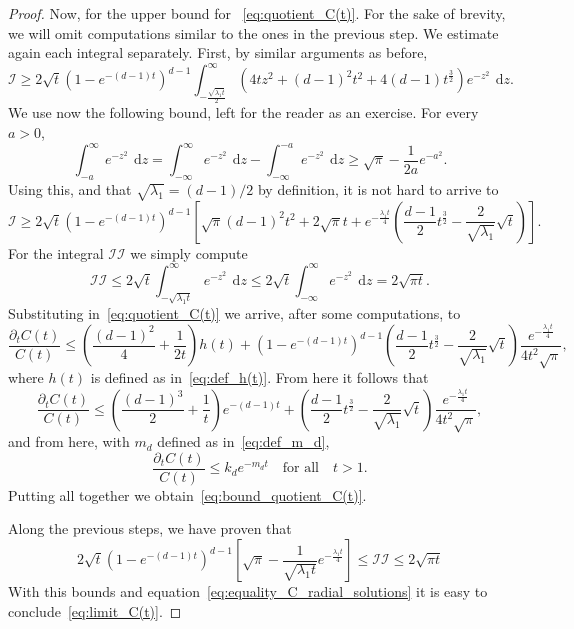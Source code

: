 \documentclass[12pt,longbibliography]{article}
\def\d{\,\mathrm{d}}
\def\d{\,\mathrm{d}}
\theoremstyle{definition}
\theoremstyle{remark}
\theoremstyle{example}
\begin{document}
\begin{proof}
	Now, for the upper bound  for ~\eqref{eq:quotient_C(t)}. For the sake of brevity, we will omit computations similar to the ones in the previous step. We estimate again each integral separately. First, by similar arguments as before,
	\[
	\mathcal{I}\geq 2\sqrt{t}\left(1-e^{-(d-1)t}\right)^{d-1}\int_{-\frac{\sqrt{\lambda_1 t}}{2}}^\infty \left(4tz^2 +(d-1)^2t^2  +4(d-1)t^\frac{3}{2}  \right) e^{-z^2}\ \d z.
	\]
	We use now the following bound, left for the reader as an exercise. For every $a>0$,
	\[
	\int_{-a}^\infty e^{-z^2}\ \d z = \int_{-\infty}^\infty e^{-z^2}\ \d z - \int_{-\infty}^{-a} e^{-z^2}\ \d z\geq \sqrt{\pi} - \frac{1}{2a}e^{-a^2}.
	\]
	Using this, and that $\sqrt{\lambda_1}=(d-1)/2$ by definition, it is not hard to arrive to
	\[
	\mathcal{I}\geq 2\sqrt{t}\left(1-e^{-(d-1)t}  \right)^{d-1}\left[\sqrt{\pi}(d-1)^2t^2+2\sqrt{\pi}t + e^{-\frac{\lambda_1 t}{4}}\left(   \frac{d-1}{2}t^\frac{3}{2} - \frac{2}{\sqrt{\lambda_1}}\sqrt{t}  \right)  \right].
	\]
	For the integral $\mathcal{II}$ we simply compute
	\[
	\mathcal{II}\leq 2\sqrt{t}\int_{-\sqrt{\lambda_1 t}}^\infty e^{-z^2}\ \d z\leq 2\sqrt{t}\int_{-\infty}^\infty e^{-z^2}\ \d z = 2\sqrt{\pi t}.
	\]
	Substituting in~\eqref{eq:quotient_C(t)} we arrive, after some computations, to
	\[
	\frac{\partial_t C(t)}{C(t)}\leq \left( \frac{(d-1)^2}{4} + \frac{1}{2t} \right)h(t) + \left(1-e^{-(d-1)t}  \right)^{d-1} \left( \frac{d-1}{2}t^\frac{3}{2} - \frac{2}{\sqrt{\lambda_1}}\sqrt{t} \right) \frac{e^{-\frac{\lambda_1 t}{4}}}{4t^2\sqrt{\pi}},
	\]
	where $h(t)$ is defined as in~\eqref{eq:def_h(t)}. From here it follows that
	\[
	\frac{\partial_t C(t)}{C(t)}\leq \left( \frac{(d-1)^3}{2} + \frac{1}{t} \right)e^{-(d-1)t} + \left( \frac{d-1}{2}t^\frac{3}{2} - \frac{2}{\sqrt{\lambda_1}}\sqrt{t} \right) \frac{e^{-\frac{\lambda_1 t}{4}}}{4t^2\sqrt{\pi}},
	\]
	and from here, with $m_d$ defined as in~\eqref{eq:def_m_d},
	\[
	\frac{\partial_t C(t)}{C(t)}\leq k_d e^{-m_d t}\quad\text{for all}\quad t>1.
	\]
	Putting all together we obtain~\eqref{eq:bound_quotient_C(t)}.
	
	Along the previous steps, we have proven that
	\[
	2\sqrt{t} \left(1- e^{-(d-1)t}\right)^{d-1}\left[\sqrt{\pi} - \frac{1}{\sqrt{\lambda_1 t}}e^{-{\frac{\lambda_1 t}{4}}} \right]\leq  \mathcal{II}\leq  2\sqrt{\pi t}
	\]
	With this bounds and equation~\eqref{eq:equality_C_radial_solutions} it is easy to conclude~\eqref{eq:limit_C(t)}.
\end{proof}
\end{document}
